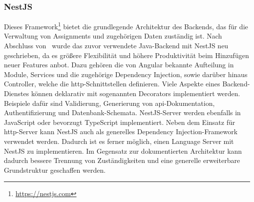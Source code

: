 \subsubsection{NestJS}
Dieses Framework\footnote{\url{https://nestjs.com}} bietet die grundlegende Architektur des Backends, das für die Verwaltung von Assignments und zugehörigen Daten zuständig ist.
Nach Abschluss von~\cite{bachelor-thesis} wurde das zuvor verwendete Java-Backend mit NestJS neu geschrieben, da es größere Flexibilität und höhere Produktivität beim Hinzufügen neuer Features anbot.
Dazu gehören die von Angular bekannte Aufteilung in Module, Services und die zugehörige Dependency Injection, sowie darüber hinaus Controller, welche die \ac{http}-Schnittstellen definieren.
Viele Aspekte eines Backend-Dienstes können deklarativ mit sogenannten Decorators implementiert werden.
Beispiele dafür sind Validierung, Generierung von \ac{api}-Dokumentation, Authentifizierung und Datenbank-Schemata.
NestJS-Server werden ebenfalls in JavaScript oder bevorzugt TypeScript implementiert.
Neben dem Einsatz für \ac{http}-Server kann NestJS auch als generelles Dependency Injection-Framework verwendet werden.
Dadurch ist es ferner möglich, einen Language Server mit NestJS zu implementieren.
Im Gegensatz zur dokumentierten\cite{vsc-language-server-guide} Architektur kann dadurch bessere Trennung von Zuständigkeiten und eine generelle erweiterbare Grundstruktur geschaffen werden.
